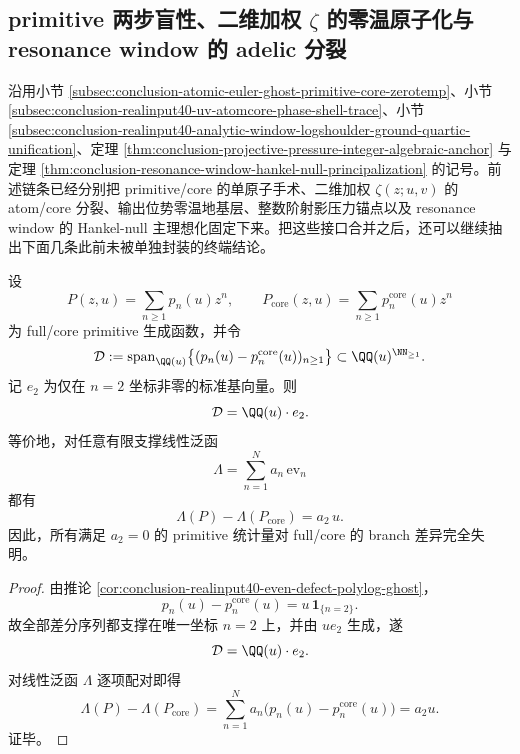 \subsection{primitive 两步盲性、二维加权 \texorpdfstring{$\zeta$}{zeta} 的零温原子化与 resonance window 的 adelic 分裂}\label{subsec:conclusion-primitive-weightedzeta-groundstate-hankel-adelic-splitting}
沿用小节 \ref{subsec:conclusion-atomic-euler-ghost-primitive-core-zerotemp}、小节 \ref{subsec:conclusion-realinput40-uv-atomcore-phase-shell-trace}、小节 \ref{subsec:conclusion-realinput40-analytic-window-logshoulder-ground-quartic-unification}、定理 \ref{thm:conclusion-projective-pressure-integer-algebraic-anchor} 与定理 \ref{thm:conclusion-resonance-window-hankel-null-principalization} 的记号。前述链条已经分别把 primitive/core 的单原子手术、二维加权 \(\zeta(z;u,v)\) 的 atom/core 分裂、输出位势零温地基层、整数阶射影压力锚点以及 resonance window 的 Hankel-null 主理想化固定下来。把这些接口合并之后，还可以继续抽出下面几条此前未被单独封装的终端结论。

\begin{theorem}\label{thm:conclusion-primitive-two-step-codimone-blindness}
设
\[
P(z,u)=\sum_{n\ge 1}p_n(u)z^n,
\qquad
P_{\mathrm{core}}(z,u)=\sum_{n\ge 1}p_n^{\mathrm{core}}(u)z^n
\]
为 full/core primitive 生成函数，并令
\[
\mathcal D:=
\operatorname{span}_{\QQ(u)}
\bigl\{
(p_n(u)-p_n^{\mathrm{core}}(u))_{n\ge 1}
\bigr\}
\subset \QQ(u)^{\NN_{\ge 1}}.
\]
记 \(e_2\) 为仅在 \(n=2\) 坐标非零的标准基向量。则
\[
\mathcal D=\QQ(u)\cdot e_2.
\]
等价地，对任意有限支撑线性泛函
\[
\Lambda=\sum_{n=1}^{N}a_n\,\mathrm{ev}_n
\]
都有
\[
\Lambda(P)-\Lambda(P_{\mathrm{core}})=a_2\,u.
\]
因此，所有满足 \(a_2=0\) 的 primitive 统计量对 full/core 的 branch 差异完全失明。
\end{theorem}
\begin{proof}
由推论 \ref{cor:conclusion-realinput40-even-defect-polylog-ghost}，
\[
p_n(u)-p_n^{\mathrm{core}}(u)=u\,\mathbf 1_{\{n=2\}}.
\]
故全部差分序列都支撑在唯一坐标 \(n=2\) 上，并由 \(u e_2\) 生成，遂
\[
\mathcal D=\QQ(u)\cdot e_2.
\]
对线性泛函 \(\Lambda\) 逐项配对即得
\[
\Lambda(P)-\Lambda(P_{\mathrm{core}})
=
\sum_{n=1}^{N}a_n\bigl(p_n(u)-p_n^{\mathrm{core}}(u)\bigr)
=
a_2u.
\]
证毕。
\end{proof}

